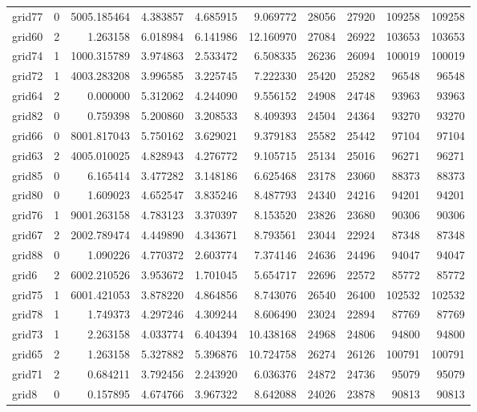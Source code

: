 \begin{longtable}{|l|r|r|r|r|r|r|r|r|r|}
grid77 & 0 & 5005.185464 & 4.383857 & 4.685915 & 9.069772 & 28056 & 27920 & 109258 & 109258 \\
grid60 & 2 & 1.263158 & 6.018984 & 6.141986 & 12.160970 & 27084 & 26922 & 103653 & 103653 \\
grid74 & 1 & 1000.315789 & 3.974863 & 2.533472 & 6.508335 & 26236 & 26094 & 100019 & 100019 \\
grid72 & 1 & 4003.283208 & 3.996585 & 3.225745 & 7.222330 & 25420 & 25282 & 96548 & 96548 \\
grid64 & 2 & 0.000000 & 5.312062 & 4.244090 & 9.556152 & 24908 & 24748 & 93963 & 93963 \\
grid82 & 0 & 0.759398 & 5.200860 & 3.208533 & 8.409393 & 24504 & 24364 & 93270 & 93270 \\
grid66 & 0 & 8001.817043 & 5.750162 & 3.629021 & 9.379183 & 25582 & 25442 & 97104 & 97104 \\
grid63 & 2 & 4005.010025 & 4.828943 & 4.276772 & 9.105715 & 25134 & 25016 & 96271 & 96271 \\
grid85 & 0 & 6.165414 & 3.477282 & 3.148186 & 6.625468 & 23178 & 23060 & 88373 & 88373 \\
grid80 & 0 & 1.609023 & 4.652547 & 3.835246 & 8.487793 & 24340 & 24216 & 94201 & 94201 \\
grid76 & 1 & 9001.263158 & 4.783123 & 3.370397 & 8.153520 & 23826 & 23680 & 90306 & 90306 \\
grid67 & 2 & 2002.789474 & 4.449890 & 4.343671 & 8.793561 & 23044 & 22924 & 87348 & 87348 \\
grid88 & 0 & 1.090226 & 4.770372 & 2.603774 & 7.374146 & 24636 & 24496 & 94047 & 94047 \\
grid6 & 2 & 6002.210526 & 3.953672 & 1.701045 & 5.654717 & 22696 & 22572 & 85772 & 85772 \\
grid75 & 1 & 6001.421053 & 3.878220 & 4.864856 & 8.743076 & 26540 & 26400 & 102532 & 102532 \\
grid78 & 1 & 1.749373 & 4.297246 & 4.309244 & 8.606490 & 23024 & 22894 & 87769 & 87769 \\
grid73 & 1 & 2.263158 & 4.033774 & 6.404394 & 10.438168 & 24968 & 24806 & 94800 & 94800 \\
grid65 & 2 & 1.263158 & 5.327882 & 5.396876 & 10.724758 & 26274 & 26126 & 100791 & 100791 \\
grid71 & 2 & 0.684211 & 3.792456 & 2.243920 & 6.036376 & 24872 & 24736 & 95079 & 95079 \\
grid8 & 0 & 0.157895 & 4.674766 & 3.967322 & 8.642088 & 24026 & 23878 & 90813 & 90813 \\

\end{longtable}

